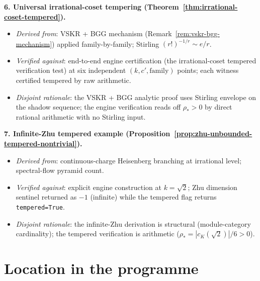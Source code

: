 \textbf{6. Universal irrational-coset tempering
(Theorem~\ref{thm:irrational-coset-tempered}).}
\begin{itemize}[nosep]
\item \emph{Derived from}: VSKR + BGG mechanism
 (Remark~\ref{rem:vskr-bgg-mechanism}) applied family-by-family;
 Stirling $(r!)^{-1/r} \sim e/r$.
\item \emph{Verified against}: end-to-end engine certification
 (the irrational-coset tempered verification test) at six
 independent $(k, c', \text{family})$ points; each witness
 certified tempered by raw arithmetic.
\item \emph{Disjoint rationale}: the VSKR + BGG analytic proof
 uses Stirling envelope on the shadow sequence; the engine
 verification reads off $\rho_* > 0$ by direct rational arithmetic
 with no Stirling input.
\end{itemize}

\textbf{7. Infinite-Zhu tempered example
(Proposition~\ref{prop:zhu-unbounded-tempered-nontrivial}).}
\begin{itemize}[nosep]
\item \emph{Derived from}: continuous-charge Heisenberg branching at
 irrational level; spectral-flow pyramid count.
\item \emph{Verified against}: explicit engine construction at $k =
 \sqrt{2}$; Zhu dimension sentinel returned as $-1$
 (infinite) while the tempered flag returns
 \texttt{tempered=True}.
\item \emph{Disjoint rationale}: the infinite-Zhu derivation is
 structural (module-category cardinality); the tempered
 verification is arithmetic ($\rho_* = |c_K(\sqrt{2})|/6 > 0$).
\end{itemize}

\section{Location in the programme}
\label{sec:irrational-cosets-location}

